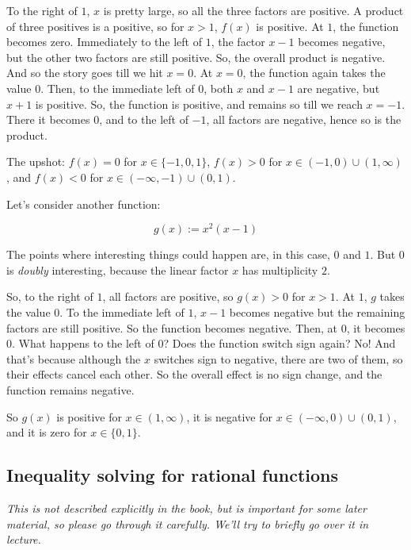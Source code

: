 \documentclass{amsart}
\begin{document}
To the right of $1$, $x$ is pretty large, so all the three factors are
positive. A product of three positives is a positive, so for $x > 1$,
$f(x)$ is positive. At $1$, the function becomes zero. Immediately to
the left of $1$, the factor $x - 1$ becomes negative, but the other
two factors are still positive. So, the overall product is
negative. And so the story goes till we hit $x = 0$. At $x = 0$, the
function again takes the value $0$. Then, to the immediate left of
$0$, both $x$ and $x - 1$ are negative, but $x + 1$ is positive. So,
the function is positive, and remains so till we reach $x = -1$. There
it becomes $0$, and to the left of $-1$, all factors are negative,
hence so is the product.

The upshot: $f(x) = 0$ for $x \in \{ -1,0,1 \}$, $f(x) > 0$ for $x \in
(-1,0) \cup (1,\infty)$, and $f(x) < 0$ for $x \in (-\infty,-1) \cup
(0,1)$.

Let's consider another function:

\begin{equation*}
  g(x) := x^2(x - 1)
\end{equation*}

The points where interesting things could happen are, in this case,
$0$ and $1$. But $0$ is {\em doubly} interesting, because the linear
factor $x$ has multiplicity $2$.

So, to the right of $1$, all factors are positive, so $g(x) > 0$ for
$x > 1$. At $1$, $g$ takes the value $0$. To the immediate left of
$1$, $x - 1$ becomes negative but the remaining factors are still
positive. So the function becomes negative. Then, at $0$, it becomes
$0$. What happens to the left of $0$? Does the function switch sign
again? No! And that's because although the $x$ switches sign to
negative, there are two of them, so their effects cancel each
other. So the overall effect is no sign change, and the function
remains negative.

So $g(x)$ is positive for $x \in (1, \infty)$, it is negative for $x
\in (-\infty,0) \cup (0,1)$, and it is zero for $x \in \{ 0,1 \}$.

\subsection{Inequality solving for rational functions}

{\em This is not described explicitly in the book, but is important
  for some later material, so please go through it carefully. We'll
  try to briefly  go over it in lecture.}
\end{document}
